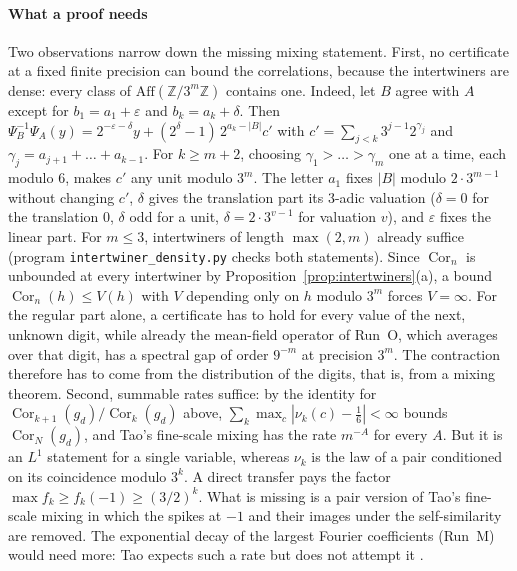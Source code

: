 \documentclass[12pt]{amsart}
\theoremstyle{definition}
\theoremstyle{remark}
\newcommand{\Z}{\mathbb{Z}}
\begin{document}
\paragraph{What a proof needs} Two observations narrow down the missing mixing statement. First, no certificate at a fixed finite precision can bound the correlations, because the intertwiners are dense: every class of $\mathrm{Aff}(\Z/3^m\Z)$ contains one. Indeed, let $B$ agree with $A$ except for $b_1=a_1+\varepsilon$ and $b_k=a_k+\delta$. Then $\Psi_B^{-1}\Psi_A(y)=2^{-\varepsilon-\delta}y+(2^\delta-1)\,2^{a_k-|B|}c'$ with $c'=\sum_{j<k}3^{j-1}2^{\gamma_j}$ and $\gamma_j=a_{j+1}+\dots+a_{k-1}$. For $k\ge m+2$, choosing $\gamma_1>\dots>\gamma_m$ one at a time, each modulo $6$, makes $c'$ any unit modulo $3^m$. The letter $a_1$ fixes $|B|$ modulo $2\cdot3^{m-1}$ without changing $c'$, $\delta$ gives the translation part its $3$-adic valuation ($\delta=0$ for the translation $0$, $\delta$ odd for a unit, $\delta=2\cdot3^{v-1}$ for valuation $v$), and $\varepsilon$ fixes the linear part. For $m\le3$, intertwiners of length $\max(2,m)$ already suffice (program \texttt{intertwiner\_density.py} checks both statements). Since $\operatorname{Cor}_n$ is unbounded at every intertwiner by Proposition~\ref{prop:intertwiners}(a), a bound $\operatorname{Cor}_n(h)\le V(h)$ with $V$ depending only on $h$ modulo $3^m$ forces $V=\infty$. For the regular part alone, a certificate has to hold for every value of the next, unknown digit, while already the mean-field operator of Run~O, which averages over that digit, has a spectral gap of order $9^{-m}$ at precision $3^m$. The contraction therefore has to come from the distribution of the digits, that is, from a mixing theorem. Second, summable rates suffice: by the identity for $\operatorname{Cor}_{k+1}(g_d)/\operatorname{Cor}_k(g_d)$ above, $\sum_k\max_c|\nu_k(c)-\frac16|<\infty$ bounds $\operatorname{Cor}_N(g_d)$, and Tao's fine-scale mixing \cite[Proposition~1.14]{Tao_2022} has the rate $m^{-A}$ for every $A$. But it is an $L^1$ statement for a single variable, whereas $\nu_k$ is the law of a pair conditioned on its coincidence modulo $3^k$. A direct transfer pays the factor $\max f_k\ge f_k(-1)\ge(3/2)^k$. What is missing is a pair version of Tao's fine-scale mixing in which the spikes at $-1$ and their images under the self-similarity are removed. The exponential decay of the largest Fourier coefficients (Run~M) would need more: Tao expects such a rate but does not attempt it \cite[Remark~1.15]{Tao_2022}.
\end{document}
